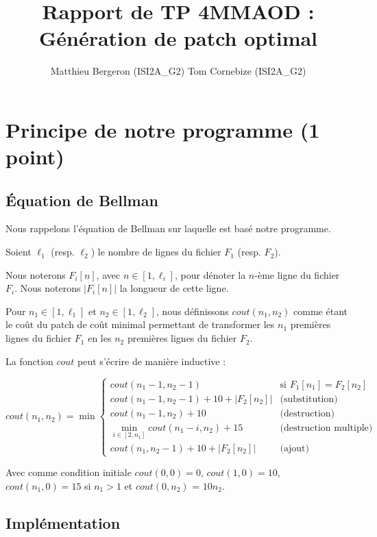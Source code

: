\documentclass[a4paper, 10pt, french]{article}
\title{Rapport de TP 4MMAOD : Génération de patch optimal}
\author{
Matthieu Bergeron (ISI2A\_G2)
Tom Cornebize (ISI2A\_G2)
}
\newcommand{\abs}[1]{\left| #1 \right|}
\begin{document}
\maketitle

\section{Principe de notre  programme (1 point)}

\subsection{Équation de Bellman}

Nous rappelons l'équation de Bellman sur laquelle est basé notre programme.

Soient $\ell_1$ (resp. $\ell_2$) le nombre de lignes du fichier $F_1$ (resp. $F_2$).

Nous noterons $F_i[n]$, avec $n \in [1, \ell_i]$, pour dénoter la $n$-ème ligne du fichier
$F_i$. Nous noterons $\abs{F_i[n]}$ la longueur de cette ligne.

Pour $n_1 \in [1, \ell_1]$ et $n_2 \in [1, \ell_2]$, nous définissons $cout(n_1, n_2)$
comme étant le coût du patch de coût minimal permettant de transformer les $n_1$
premières lignes du fichier $F_1$ en les $n_2$ premières lignes du fichier $F_2$.

La fonction $cout$ peut s'écrire de manière inductive :

\[
    cout(n_1, n_2) = \min
    \begin{cases}
        cout(n_1-1, n_2-1)                          & \text{si } F_1[n_1] = F_2[n_2]\\
        cout(n_1-1, n_2-1) + 10 + \abs{F_2[n_2]}    & \text{(substitution)}\\
        cout(n_1-1, n_2) + 10                       & \text{(destruction)}\\
        \min_{i \in [2, n_1]} cout(n_1-i, n_2) + 15          & \text{(destruction multiple)}\\
        cout(n_1, n_2-1) + 10 + \abs{F_2[n_2]}      & \text{(ajout)}
    \end{cases}
\]

Avec comme condition initiale $cout(0, 0) = 0$, $cout(1, 0) = 10$, $cout(n_1, 0) = 15$
si $n_1 > 1$ et $cout(0, n_2)$ = $10n_2$.

\subsection{Implémentation}
\end{document}
